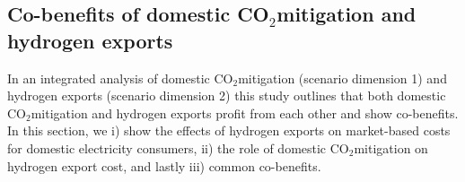 \documentclass[5p,numafflabel]{elsarticle}
\newcommand{\co}{\ce{CO2}~}
\def\co{CO${}_2${\:}}
\begin{document}
\subsection*{Co-benefits of domestic \co mitigation and hydrogen exports}
\label{subsec:benefits}

In an integrated analysis of domestic \co mitigation (scenario dimension 1) and hydrogen exports (scenario dimension 2) this study outlines that both domestic \co mitigation and hydrogen exports profit from each other and show co-benefits. In this section, we i) show the effects of hydrogen exports on market-based costs for domestic electricity consumers, ii) the role of domestic \co mitigation on hydrogen export cost, and lastly iii) common co-benefits.
\end{document}
